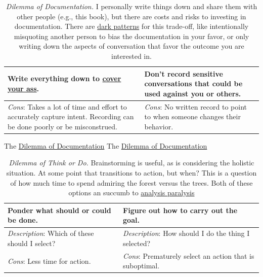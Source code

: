 \begin{center}
\begin{table}[H] %
\begin{tabular}{ | m{\dilemmatablewidth}| m{\dilemmatablewidth} | } 
  \hline
  \textbf{Write everything down to \href{https://en.wikipedia.org/wiki/Cover_your_ass}{cover your ass}.} &
  \textbf{Don't record sensitive conversations that could be used against you or others.} \\
  \hline
  \textit{Cons}: Takes a lot of time and effort to accurately capture intent. Recording can be done poorly or be misconstrued.  & 
  \textit{Cons}: No written record to point to when someone changes their behavior. \\
  \hline
\end{tabular}
\caption{\textit{Dilemma of Documentation.}
I personally write things down and share them with other people (e.g., this book), but there are costs and risks to investing in documentation. There are \href{https://en.wikipedia.org/wiki/Dark_pattern}{dark patterns} for this trade-off, like intentionally misquoting another person to bias the documentation in your favor, or only writing down the aspects of conversation that favor the outcome you are interested in.}
\label{table:notes_or_no_notes}
\end{table}
\end{center}

The \href{table:notes_or_no_notes}{Dilemma of Documentation}
The \href{table:notes_or_no_notes}{Dilemma of Documentation}
  

\begin{center}
\begin{table}[H] %
\begin{tabular}{ | m{\dilemmatablewidth}| m{\dilemmatablewidth} | } 
  \hline
  \textbf{Ponder what should or could be done.} &
  \textbf{Figure out how to carry out the goal.}\\
  \hline
  \textit{Description}: Which of these should I select? & 
  \textit{Description}: How should I do the thing I selected? \\
  \hline
  \textit{Cons}: Less time for action. & 
  \textit{Cons}: Prematurely select an action that is suboptimal. \\
  \hline
\end{tabular}
\caption{\textit{Dilemma of Think or Do.}
Brainstorming is useful, as is considering the holistic situation. At some point that transitions to action, but when? This is a question of how much time to spend admiring the forest versus the trees. Both of these options an succumb to \href{https://en.wikipedia.org/wiki/Analysis_paralysis}{analysis paralysis}
}
\label{table:forest-vs-trees}
\end{table}
\end{center}

